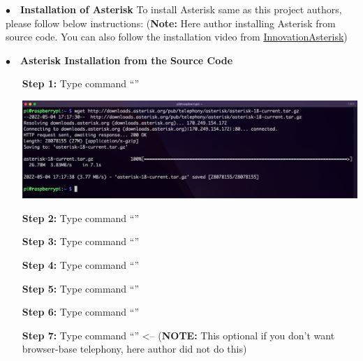 \noindent$\bullet$~~\textbf{Installation of Asterisk}	\label{sec:run-asterisk}
	To install Asterisk same as this project authors, please follow below instructions: (\textbf{Note:} Here author installing Asterisk from source code. You can also follow the installation video from \href{https://www.youtube.com/watch?v=52sEPVPV9JE&list=PLruX0IBTg1G4Auvo5YhoJKgskmMP7b8bJ&index=4&ab_channel=InnovateAsterisk}{InnovationAsterisk})
	
\noindent$\bullet$~~\textbf{Asterisk Installation from the Source Code}
		\begin{itemize}[leftmargin=1.7cm]
			\item[\textbf{Step 1:}] Type command ``{\selectfont{wget http://downloads.as\\terisk.org/pub/telephony/asterisk/aste\\risk-18-current.tar.gz}}''\\
				\begin{minipage}{\textwidth}
					\vspace{2mm}
					\includegraphics[scale=0.1]{Images/raspberry_pi/asterisk_install/wget.png}
					\vspace{2mm}
				\end{minipage}
			
			\item[\textbf{Step 2:}] Type command ``{\selectfont{sudo apt-get update}}''
			\item[\textbf{Step 3:}] Type command ``{\selectfont{sudo apt-get upgrade}}''
			\item[\textbf{Step 4:}] Type command ``{\selectfont{sudo apt-get install ntp}}''
			\item[\textbf{Step 5:}] Type command ``{\selectfont{sudo apt-get install spe\\ex speex* libspeex-dev libspeexdsp-dev\\}}''
			\item[\textbf{Step 6:}] Type command ``{\selectfont{sudo apt-get install lib\\speex-dev libspeexdsp-dev speex speex-\\doc}}''
			\item[\textbf{Step 7:}] Type command ``{\selectfont{sudo apt-get install xm\\lstarlet libopus-dev libopusfile-dev}}'' <-- (\textbf{NOTE:} This optional if you don't want browser-base telephony, here author did not do this)
			

\end{itemize}
